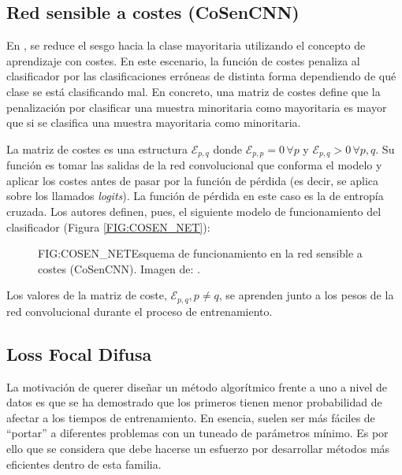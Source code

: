 \subsection{Red sensible a costes (CoSenCNN)\label{SUBSEC:COSEN_NET}}

En \citet{khan2017cost}, se reduce el sesgo hacia la clase mayoritaria utilizando el concepto de aprendizaje con costes. En este escenario, la función de costes penaliza al clasificador por las clasificaciones erróneas de distinta forma dependiendo de qué clase se está clasificando mal. En concreto, una matriz de costes define que la penalización por clasificar una muestra minoritaria como mayoritaria es mayor que si se clasifica una muestra mayoritaria como minoritaria.

La matriz de costes es una estructura $\mathcal{E}_{p,q}$ donde $\mathcal{E}_{p,p} = 0\,\forall p$ y $\mathcal{E}_{p,q} > 0\,\forall p,q$. Su función es tomar las salidas de la red convolucional que conforma el modelo y aplicar los costes antes de pasar por la función de pérdida (es decir, se aplica sobre los llamados \textit{logits}). La función de pérdida en este caso es la de entropía cruzada. Los autores definen, pues, el siguiente modelo de funcionamiento del clasificador (Figura \ref{FIG:COSEN_NET}):

\begin{figure}[Esquema de la red sensible a costes (CoSenCNN)]{FIG:COSEN_NET}{Esquema de funcionamiento en la red sensible a costes (CoSenCNN). Imagen de: \citet{khan2017cost}.}
\end{figure}

Los valores de la matriz de coste, $\mathcal{E}_{p,q}, p \neq q$, se aprenden junto a los pesos de la red convolucional durante el proceso de entrenamiento.

\subsection{Loss Focal Difusa\label{SUBSEC:FUZZY_LOSS}}

La motivación de querer diseñar un método algorítmico frente a uno a nivel de datos es que se ha demostrado que los primeros tienen menor probabilidad de afectar a los tiempos de entrenamiento. En esencia, suelen ser más fáciles de ``portar'' a diferentes problemas con un tuneado de parámetros mínimo. Es por ello que se considera que debe hacerse un esfuerzo por desarrollar métodos más eficientes dentro de esta familia.

